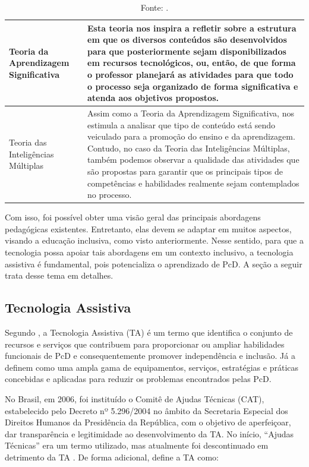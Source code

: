 \begin{table}[htbp]
\begin{tabularx}{\textwidth}{p{3.5cm}|X}
Teoria da Aprendizagem Significativa & Esta teoria nos inspira a refletir sobre a estrutura em que os diversos \textbf{conteúdos são desenvolvidos para que posteriormente sejam disponibilizados em recursos tecnológicos}, ou, então, de que forma o professor planejará as atividades para que todo o processo seja organizado de forma significativa e atenda aos objetivos propostos. \\ \hline
Teoria das Inteligências Múltiplas & Assim como a Teoria da Aprendizagem Significativa, nos estimula a analisar que tipo de conteúdo está sendo veiculado para a promoção do ensino e da aprendizagem. Contudo, no caso da Teoria das Inteligências Múltiplas, também podemos observar a qualidade das atividades que são propostas para garantir que os principais tipos de competências e habilidades realmente sejam contemplados no processo. \\ \hline
\end{tabularx}
\caption*{Fonte: .}
\end{table}

Com isso, foi possível obter uma visão geral das principais abordagens pedagógicas existentes. Entretanto, elas devem se adaptar em muitos aspectos, visando a educação inclusiva, como visto anteriormente. Nesse sentido, para que a tecnologia possa apoiar tais abordagens em um contexto inclusivo, a tecnologia assistiva é fundamental, pois potencializa o aprendizado de PcD. A seção a seguir trata desse tema em detalhes.

\subsection{Tecnologia Assistiva}
\label{fundamentacao-teorica:tic:assistiva}

Segundo , a Tecnologia Assistiva (TA) é um termo que identifica o conjunto de recursos e serviços que contribuem para proporcionar ou ampliar habilidades funcionais de PcD e consequentemente promover independência e inclusão. Já  a definem como uma ampla gama de equipamentos, serviços, estratégias e práticas concebidas e aplicadas para reduzir os problemas encontrados pelas PcD.

No Brasil, em 2006, foi instituído o Comitê de Ajudas Técnicas (CAT), estabelecido pelo Decreto nº 5.296/2004 no âmbito da Secretaria Especial dos Direitos Humanos da Presidência da República, com o objetivo de aperfeiçoar, dar transparência e legitimidade ao desenvolvimento da TA. No início, ``Ajudas Técnicas'' era um termo utilizado, mas atualmente foi descontinuado em detrimento da TA \cite{Cat2008}. De forma adicional,  define a TA como:

